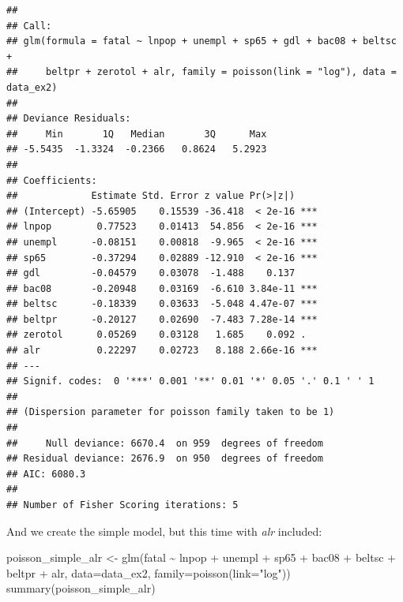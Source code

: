 \documentclass[
]{article}
\newenvironment{Shaded}{\begin{snugshade}}{\end{snugshade}}
\newcommand{\AttributeTok}[1]{\textcolor[rgb]{0.77,0.63,0.00}{#1}}
\newcommand{\FunctionTok}[1]{\textcolor[rgb]{0.00,0.00,0.00}{#1}}
\newcommand{\NormalTok}[1]{#1}
\newcommand{\OtherTok}[1]{\textcolor[rgb]{0.56,0.35,0.01}{#1}}
\newcommand{\SpecialCharTok}[1]{\textcolor[rgb]{0.00,0.00,0.00}{#1}}
\newcommand{\StringTok}[1]{\textcolor[rgb]{0.31,0.60,0.02}{#1}}
\begin{document}
\begin{verbatim}
## 
## Call:
## glm(formula = fatal ~ lnpop + unempl + sp65 + gdl + bac08 + beltsc + 
##     beltpr + zerotol + alr, family = poisson(link = "log"), data = data_ex2)
## 
## Deviance Residuals: 
##     Min       1Q   Median       3Q      Max  
## -5.5435  -1.3324  -0.2366   0.8624   5.2923  
## 
## Coefficients:
##             Estimate Std. Error z value Pr(>|z|)    
## (Intercept) -5.65905    0.15539 -36.418  < 2e-16 ***
## lnpop        0.77523    0.01413  54.856  < 2e-16 ***
## unempl      -0.08151    0.00818  -9.965  < 2e-16 ***
## sp65        -0.37294    0.02889 -12.910  < 2e-16 ***
## gdl         -0.04579    0.03078  -1.488    0.137    
## bac08       -0.20948    0.03169  -6.610 3.84e-11 ***
## beltsc      -0.18339    0.03633  -5.048 4.47e-07 ***
## beltpr      -0.20127    0.02690  -7.483 7.28e-14 ***
## zerotol      0.05269    0.03128   1.685    0.092 .  
## alr          0.22297    0.02723   8.188 2.66e-16 ***
## ---
## Signif. codes:  0 '***' 0.001 '**' 0.01 '*' 0.05 '.' 0.1 ' ' 1
## 
## (Dispersion parameter for poisson family taken to be 1)
## 
##     Null deviance: 6670.4  on 959  degrees of freedom
## Residual deviance: 2676.9  on 950  degrees of freedom
## AIC: 6080.3
## 
## Number of Fisher Scoring iterations: 5
\end{verbatim}

And we create the simple model, but this time with \emph{alr} included:

\begin{Shaded}
\begin{Highlighting}[]
\NormalTok{poisson\_simple\_alr }\OtherTok{\textless{}{-}} \FunctionTok{glm}\NormalTok{(fatal }\SpecialCharTok{\textasciitilde{}}\NormalTok{ lnpop }\SpecialCharTok{+}\NormalTok{ unempl }\SpecialCharTok{+}\NormalTok{ sp65 }\SpecialCharTok{+}\NormalTok{ bac08 }\SpecialCharTok{+}\NormalTok{ beltsc }\SpecialCharTok{+}\NormalTok{ beltpr }\SpecialCharTok{+}\NormalTok{ alr, }\AttributeTok{data=}\NormalTok{data\_ex2, }\AttributeTok{family=}\FunctionTok{poisson}\NormalTok{(}\AttributeTok{link=}\StringTok{"log"}\NormalTok{))}
\FunctionTok{summary}\NormalTok{(poisson\_simple\_alr)}
\end{Highlighting}
\end{Shaded}
\end{document}
